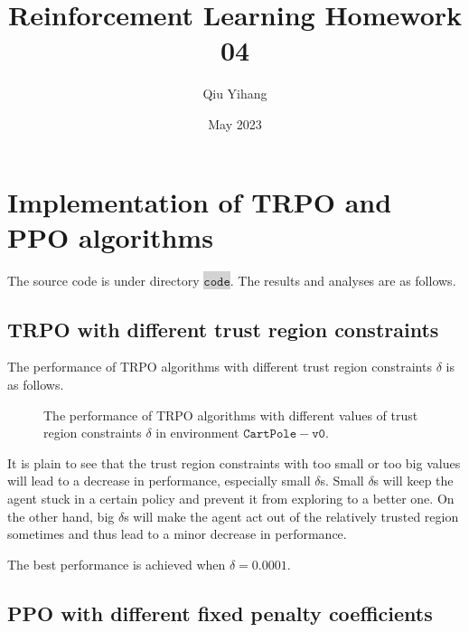 \documentclass{article}
\title{\textbf{Reinforcement Learning Homework 04}}
\author{Qiu Yihang}
\date{May 2023}
\begin{document}
\maketitle

\vspace{1em}
\section{Implementation of TRPO and PPO algorithms}
\vspace{1em}
The source code is under directory \colorbox{lightgray}{$\mathtt{code}$}. The results and analyses are as follows.

\vspace{1em}
\subsection{TRPO with different trust region constraints}
\vspace{1em}

\hspace{1.8em}
The performance of TRPO algorithms with different trust region constraints $\delta$ is as follows.


\begin{figure}[htbp]
    \centering
    \subfigure[random seed=14985]{
        \texttt{[image: seed=14985/TRPO\_vary\_kl.pdf]}
    }
    \subfigure[random seed=20210530]{
        \texttt{[image: seed=20210530/TRPO\_vary\_kl.pdf]}
    }

    \caption{The performance of TRPO algorithms with different values of trust region constraints $\delta$ in environment $\mathtt{CartPole-v0}$.}
\end{figure}

It is plain to see that the trust region constraints with too small or too big values will lead to a decrease in performance, especially small $\delta$s. Small $\delta$s will keep the agent stuck in a certain policy and prevent it from exploring to a better one. On the other hand, big $\delta$s will make the agent act out of the relatively trusted region sometimes and thus lead to a minor decrease in performance. 

The best performance is achieved when $\delta=0.0001$.

\vspace{1em}
\subsection{PPO with different fixed penalty coefficients}
\vspace{1em}
\end{document}
